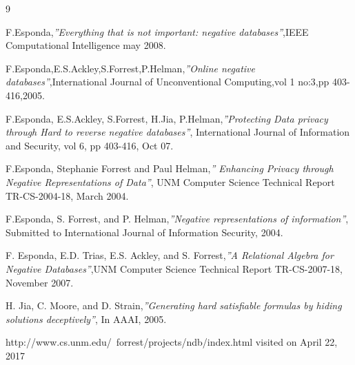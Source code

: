 \documentclass[12pt,a4paper,titlepage]{report}
\begin{document}

\begin{thebibliography}{9}

F.Esponda,\emph{''Everything that is not important: negative databases''},IEEE Computational Intelligence may 2008.

F.Esponda,E.S.Ackley,S.Forrest,P.Helman,\emph{''Online negative databases''},International Journal of Unconventional Computing,vol 1 no:3,pp 403-416,2005.

F.Esponda, E.S.Ackley, S.Forrest, H.Jia, P.Helman,\emph{''Protecting Data 	privacy through Hard to reverse negative databases''}, 	International Journal of Information and Security, vol 6, pp 403-416, 	Oct 07.

F.Esponda, Stephanie Forrest and Paul Helman,\emph{'' Enhancing 	Privacy through Negative Representations of Data''}, UNM 	Computer Science Technical Report TR-CS-2004-18, March 2004.

F.Esponda, S. Forrest, and P. Helman,\emph{''Negative representations of information''},
Submitted to International Journal of Information Security, 2004.

F. Esponda, E.D. Trias, E.S. Ackley, and S. Forrest,\emph{''A Relational Algebra for Negative Databases''},UNM Computer Science Technical Report TR-CS-2007-18, November 2007.

H. Jia, C. Moore, and D. Strain,\emph{''Generating hard satisfiable formulas by hiding
solutions deceptively''}, In AAAI, 2005.

http://www.cs.unm.edu/~forrest/projects/ndb/index.html visited on April 22, 2017

\end{thebibliography}

\end{document}
